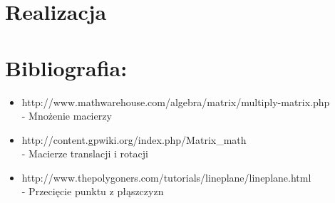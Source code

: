 \documentclass{article}
\begin{document}
\section{Realizacja}


\section{Bibliografia:}
\begin{itemize}
\item http://www.mathwarehouse.com/algebra/matrix/multiply-matrix.php \\- Mnożenie macierzy
\item http://content.gpwiki.org/index.php/Matrix\_math \\- Macierze translacji i rotacji
\item http://www.thepolygoners.com/tutorials/lineplane/lineplane.html \\- Przecięcie punktu z płąszczyzn
\end{itemize}
\end{document}

